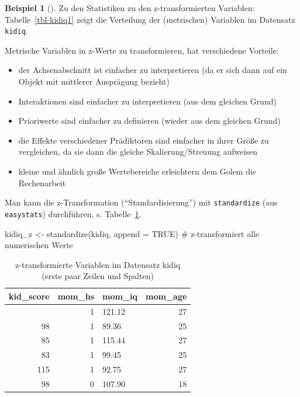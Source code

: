 \documentclass[
  ngerman,
  letterpaper,
  twoside,
  open=any]{scrbook}
\newenvironment{Shaded}{\begin{snugshade}}{\end{snugshade}}
\newcommand{\AttributeTok}[1]{\textcolor[rgb]{0.40,0.45,0.13}{#1}}
\newcommand{\CommentTok}[1]{\textcolor[rgb]{0.37,0.37,0.37}{#1}}
\newcommand{\ConstantTok}[1]{\textcolor[rgb]{0.56,0.35,0.01}{#1}}
\newcommand{\FunctionTok}[1]{\textcolor[rgb]{0.28,0.35,0.67}{#1}}
\newcommand{\NormalTok}[1]{\textcolor[rgb]{0.00,0.23,0.31}{#1}}
\newcommand{\OtherTok}[1]{\textcolor[rgb]{0.00,0.23,0.31}{#1}}
\providecommand{\tightlist}{%
  \setlength{\itemsep}{0pt}\setlength{\parskip}{0pt}}\usepackage{longtable,booktabs,array}
\theoremstyle{definition}
\newtheorem{example}{Beispiel}[chapter]
\theoremstyle{plain}
\theoremstyle{definition}
\theoremstyle{definition}
\theoremstyle{remark}
\begin{document}
\begin{example}[]
Zu den Statistiken zu den z-transformierten Variablen:
Tabelle~\ref{tbl-kidiq1} zeigt die Verteilung der (metrischen) Variablen
im Datensatz \texttt{kidiq}.

Metrische Variablen in z-Werte zu transformieren, hat verschiedene
Vorteile:

\begin{itemize}
\tightlist
\item
  der Achsenabschnitt ist einfacher zu interpretieren (da er sich dann
  auf ein Objekt mit mittlerer Ausprägung bezieht)
\item
  Interaktionen sind einfacher zu interpretieren (aus dem gleichen
  Grund)
\item
  Prioriwerte sind einfacher zu definieren (wieder aus dem gleichen
  Grund)
\item
  die Effekte verschiedener Prädiktoren sind einfacher in ihrer Größe zu
  vergleichen, da sie dann die gleiche Skalierung/Streuung aufweisen
\item
  kleine und ähnlich große Wertebereiche erleichtern dem Golem die
  Rechenarbeit
\end{itemize}

Man kann die z-Transformation (\enquote{Standardisierung}) mit
\texttt{standardize} (aus \texttt{easystats}) durchführen, s.
Tabelle~\ref{tbl-kidiq-z}.

\begin{Shaded}
\begin{Highlighting}[]
\NormalTok{kidiq\_z }\OtherTok{\textless{}{-}} 
  \FunctionTok{standardize}\NormalTok{(kidiq, }\AttributeTok{append =} \ConstantTok{TRUE}\NormalTok{)  }\CommentTok{\# z{-}transformiert alle numerischen Werte}
\end{Highlighting}
\end{Shaded}

{

\begin{longtable}[]{@{}rrlr@{}}

\caption{\label{tbl-kidiq-z}z-transformierte Variablen im Datensatz
kidiq (erste paar Zeilen und Spalten)}

\tabularnewline

\toprule\noalign{}
kid\_score & mom\_hs & mom\_iq & mom\_age \\
\midrule\noalign{}
\endhead
\bottomrule\noalign{}
\endlastfoot
65 & 1 & 121.12 & 27 \\
98 & 1 & 89.36 & 25 \\
85 & 1 & 115.44 & 27 \\
83 & 1 & 99.45 & 25 \\
115 & 1 & 92.75 & 27 \\
98 & 0 & 107.90 & 18 \\


\end{longtable}}
\end{example}
\end{document}
